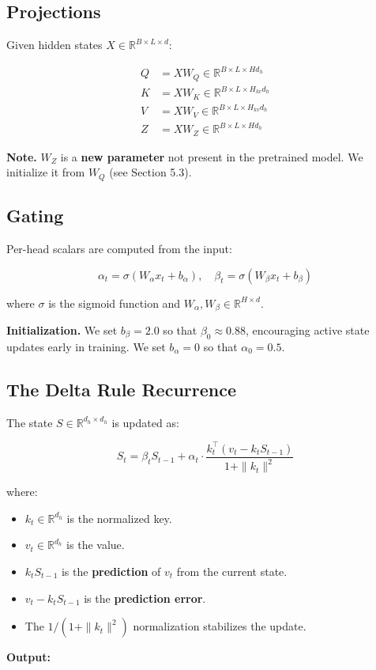 \subsection{Projections}

Given hidden states $X \in \mathbb{R}^{B \times L \times d}$:

\[
\begin{aligned}
Q &= X W_Q \in \mathbb{R}^{B \times L \times H d_h} \\
K &= X W_K \in \mathbb{R}^{B \times L \times H_{kv} d_h} \\
V &= X W_V \in \mathbb{R}^{B \times L \times H_{kv} d_h} \\
Z &= X W_Z \in \mathbb{R}^{B \times L \times H d_h}
\end{aligned}
\tag{4.1}
\]

\textbf{Note.} $W_Z$ is a \textbf{new parameter} not present in the pretrained model. 
We initialize it from $W_Q$ (see Section 5.3).

\subsection{Gating}

Per-head scalars are computed from the input:

\[
\alpha_t = \sigma(W_\alpha x_t + b_\alpha), \quad
\beta_t = \sigma(W_\beta x_t + b_\beta)
\tag{4.2}
\]

where $\sigma$ is the sigmoid function and $W_\alpha, W_\beta \in \mathbb{R}^{H \times d}$.

\textbf{Initialization.} We set $b_\beta = 2.0$ so that $\beta_0 \approx 0.88$, 
encouraging active state updates early in training. We set $b_\alpha = 0$ 
so that $\alpha_0 = 0.5$.

\subsection{The Delta Rule Recurrence}

The state $S \in \mathbb{R}^{d_h \times d_h}$ is updated as:

\[
\boxed{
S_t = \beta_t S_{t-1} + \alpha_t \cdot \frac{k_t^\top (v_t - k_t S_{t-1})}{1 + \|k_t\|^2}
}
\tag{4.3}
\]

where:
\begin{itemize}
\item $k_t \in \mathbb{R}^{d_h}$ is the normalized key.
\item $v_t \in \mathbb{R}^{d_h}$ is the value.
\item $k_t S_{t-1}$ is the \textbf{prediction} of $v_t$ from the current state.
\item $v_t - k_t S_{t-1}$ is the \textbf{prediction error}.
\item The $1 / (1 + \|k_t\|^2)$ normalization stabilizes the update.

\end{itemize}
\textbf{Output:}

